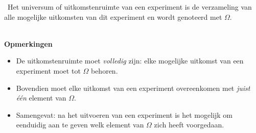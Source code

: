\begin{definition}\
 Het universum of uitkomstenruimte van een experiment
is de verzameling van alle mogelijke uitkomsten van dit experiment en
wordt genoteerd met $\Omega$.
\end{definition}
~\\
\textbf{Opmerkingen}
\begin{itemize}
\item De uitkomstenruimte moet \emph{volledig}\/ zijn: elke mogelijke
uitkomst van een experiment moet tot $\Omega$ behoren.
\item Bovendien moet elke
uitkomst van een experiment overeenkomen met \emph{juist \'e\'en}\/ element van
$\Omega$.
\item Samengevat: na het uitvoeren van een experiment is het  mogelijk  om eenduidig
aan te geven welk element van $\Omega$ zich heeft voorgedaan.
\end{itemize}


